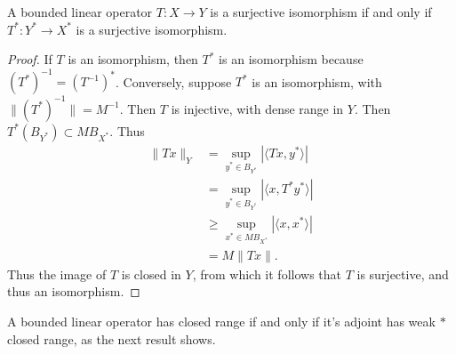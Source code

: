 \begin{theorem}
    A bounded linear operator $T: X \to Y$ is a surjective isomorphism if and only if $T^*: Y^* \to X^*$ is a surjective isomorphism.
\end{theorem}
\begin{proof}
    If $T$ is an isomorphism, then $T^*$ is an isomorphism because $(T^*)^{-1} = (T^{-1})^*$. Conversely, suppose $T^*$ is an isomorphism, with $\| (T^*)^{-1} \| = M^{-1}$. Then $T$ is injective, with dense range in $Y$. Then $T^*(B_{Y^*}) \subset M B_{X^*}$. Thus
    \begin{align*}
        \| Tx \|_Y &= \sup_{y^* \in B_{Y^*}} |\langle Tx, y^* \rangle|\\
        &= \sup_{y^* \in B_{Y^*}} |\langle x, T^* y^* \rangle|\\
        &\geq \sup_{x^* \in M B_{X^*}} |\langle x, x^* \rangle|\\
        &= M \| Tx \|.
    \end{align*}
    Thus the image of $T$ is closed in $Y$, from which it follows that $T$ is surjective, and thus an isomorphism.
\end{proof}

A bounded linear operator has closed range if and only if it's adjoint has weak $*$ closed range, as the next result shows.

